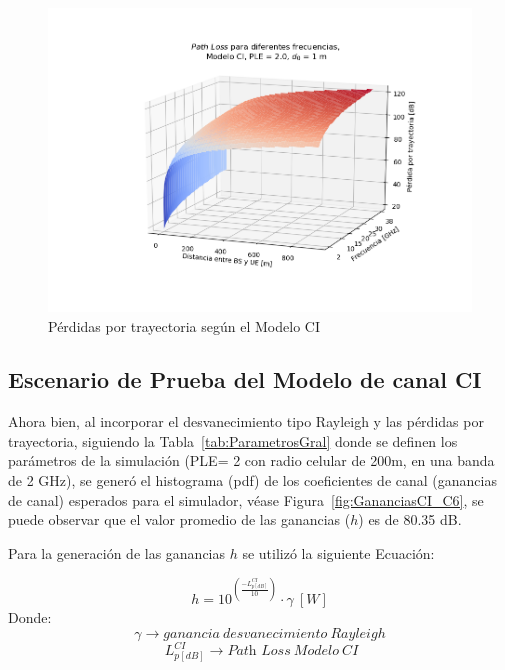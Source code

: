 \begin{figure}[th]
    \centering
    \includegraphics[scale=.6]{Figures/MODELOCI3D_1m.png}
    \decoRule
    \caption[Pérdidas por trayectoria según el Modelo CI]{Pérdidas por trayectoria según el Modelo CI}
    \label{fig:PerdidasCI_C6}
\end{figure}

\subsection{Escenario de Prueba del Modelo de canal CI}

Ahora bien, al incorporar el desvanecimiento tipo Rayleigh y las pérdidas por trayectoria, siguiendo la Tabla~\ref{tab:ParametrosGral} donde se definen los parámetros de la simulación (PLE= 2 con radio celular de 200m, en una banda de 2 GHz), se generó el histograma (pdf) de los coeficientes de canal (ganancias de canal) esperados para el simulador, véase Figura~\ref{fig:GananciasCI_C6}, se puede observar que el valor promedio de las ganancias ($h$) es de 80.35 dB. \newline

Para la generación de las ganancias $h$ se utilizó la siguiente Ecuación:\newline

\begin{equation}
    h =  10^{(\frac{-L_{p [dB]}^{CI}}{10})} \cdot \gamma\ [W]
    \label{eqn:h_canal}
\end{equation}
Donde:
\[\gamma \to ganancia\ desvanecimiento\ Rayleigh\]
\[\ L_{p [dB]}^{CI} \to \textit{Path\ Loss}\ Modelo\ CI \]


